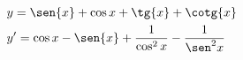 \begin{ex}
\begin{align}
&y=\sen{x}+\cos{x}+\tg{x}+\cotg{x}\nonumber\\
&y'=\cos{x}-\sen{x}+\frac{1}{\cos^2{x}}-\frac{1}{\sen^2{x}}\nonumber
\end{align}
\end{ex}